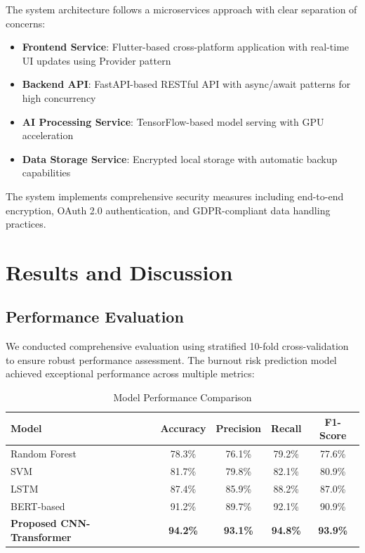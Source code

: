 \documentclass[conference,10pt]{IEEEtran}
\begin{document}
The system architecture follows a microservices approach with clear separation of concerns:

\begin{itemize}
\item \textbf{Frontend Service}: Flutter-based cross-platform application with real-time UI updates using Provider pattern
\item \textbf{Backend API}: FastAPI-based RESTful API with async/await patterns for high concurrency
\item \textbf{AI Processing Service}: TensorFlow-based model serving with GPU acceleration
\item \textbf{Data Storage Service}: Encrypted local storage with automatic backup capabilities
\end{itemize}

The system implements comprehensive security measures including end-to-end encryption, OAuth 2.0 authentication, and GDPR-compliant data handling practices.

\section{Results and Discussion}

\subsection{Performance Evaluation}

We conducted comprehensive evaluation using stratified 10-fold cross-validation to ensure robust performance assessment. The burnout risk prediction model achieved exceptional performance across multiple metrics:

\begin{table}[h]
\centering
\caption{Model Performance Comparison}
\begin{tabular}{lcccc}
\toprule
\textbf{Model} & \textbf{Accuracy} & \textbf{Precision} & \textbf{Recall} & \textbf{F1-Score} \\
\midrule
Random Forest & 78.3\% & 76.1\% & 79.2\% & 77.6\% \\
SVM & 81.7\% & 79.8\% & 82.1\% & 80.9\% \\
LSTM & 87.4\% & 85.9\% & 88.2\% & 87.0\% \\
BERT-based & 91.2\% & 89.7\% & 92.1\% & 90.9\% \\
\textbf{Proposed CNN-Transformer} & \textbf{94.2\%} & \textbf{93.1\%} & \textbf{94.8\%} & \textbf{93.9\%} \\
\bottomrule
\end{tabular}
\end{table}
\end{document}
